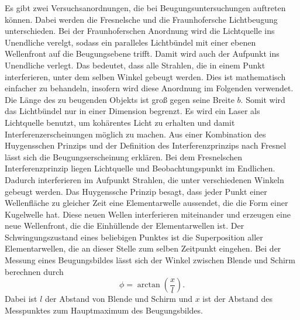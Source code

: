 \noindent Es gibt zwei Versuchsanordnungen, die bei Beugungsuntersuchungen 
auftreten können. Dabei werden die Fresnelsche und die 
Fraunhofersche Lichtbeugung unterschieden. Bei der 
Fraunhoferschen Anordnung wird die Lichtquelle ins Unendliche 
verelgt, sodass ein paralleles Lichtbündel mit einer ebenen 
Wellenfront auf die Beugungsebene trifft. Damit wird auch der Aufpunkt 
ins Unendliche  verlegt. Das bedeutet, dass alle Strahlen, die 
in einem Punkt interferieren, unter dem selben Winkel gebeugt 
werden. Dies ist mathematisch einfacher zu behandeln, insofern 
wird diese Anordnung im Folgenden verwendet. 
\newline
Die Länge des zu beugenden Objekts ist groß gegen seine 
Breite $b$. Somit wird das Lichtbündel nur in einer 
Dimension begrenzt.
\newline
Es wird ein Laser als Lichtquelle benutzt, um kohärentes Licht 
zu erhalten und damit Interferenzerscheinungen möglich zu machen. 
\newline
Aus einer Kombination des Huygensschen Prinzips und der 
Definition des Interferenzprinzips nach Fresnel lässt sich die 
Beugungserscheinung erklären. 
Bei dem Fresnelschen Interferenzprinzip liegen Lichtquelle und
Beobachtungspunkt im Endlichen. Dadurch interferieren im Aufpunkt
Strahlen, die unter verschiedenen Winkeln gebeugt werden.
Das Huygenssche Prinzip besagt, 
dass jeder Punkt einer Wellenfläche zu gleicher Zeit eine 
Elementarwelle aussendet, die die Form einer Kugelwelle hat. 
Diese neuen Wellen interferieren miteinander und erzeugen eine
neue Wellenfront, die die Einhüllende der Elementarwellen ist.
Der Schwingungszustand eines beliebigen Punktes ist 
die Superposition aller Elementarwellen, die an dieser Stelle zum 
selben Zeitpunkt eingehen.
\newline
Bei der Messung eines Beugungsbildes lässt sich der Winkel
zwischen Blende und Schirm berechnen durch 
\begin{equation}
    \phi = \arctan (\frac{x}{l}).
    \label{eqn:phi}
\end{equation}
Dabei ist $l$ der Abstand von Blende und Schirm und
$x$ ist der Abstand des Messpunktes zum Hauptmaximum
des Beugungsbildes. %

